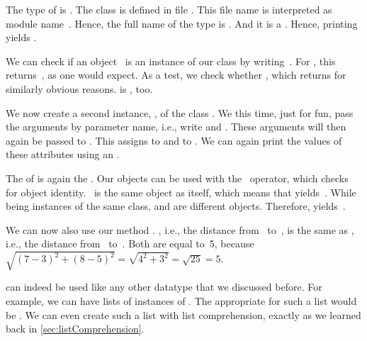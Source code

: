 The type of  is .
The class  is defined in file .
This file name is interpreted as module name~.
Hence, the full name of the type is .
And it is a .
Hence, printing  yields .

We can check if an object~ is an instance of our class  by writing~.
For , this returns~, as one would expect.
As a test, we check whether , which returns  for similarly obvious reasons.
 is , too.

We now create a second instance, , of the class .
We this time, just for fun, pass the arguments by parameter name, i.e., write  and .
These arguments will then again be passed to .
This assigns  to  and  to .
We can again print the values of these attributes using an .

The  of  is again the  .
Our objects can be used with the ~operator, which checks for object identity.
~is the same object as itself, which means that  yields~.
While being instances of the same class,  and  are different objects.
Therefore,  yields~.
%
\begin{sloppypar}%
We can now also use our method .
, i.e., the distance from~ to~, is the same as , i.e., the distance from~ to~.
Both are equal to~5, because~$\sqrt{(7 - 3)^2 + (8 - 5)^2}=\sqrt{4^2 + 3^2}=\sqrt{25}=5$.%
\end{sloppypar}%
%
 can indeed be used like any other datatype that we discussed before.
For example, we can have lists of instances of .
The appropriate  for such a list would be .
We can even create such a list with list comprehension, exactly as we learned back in \cref{sec:listComprehension}.


